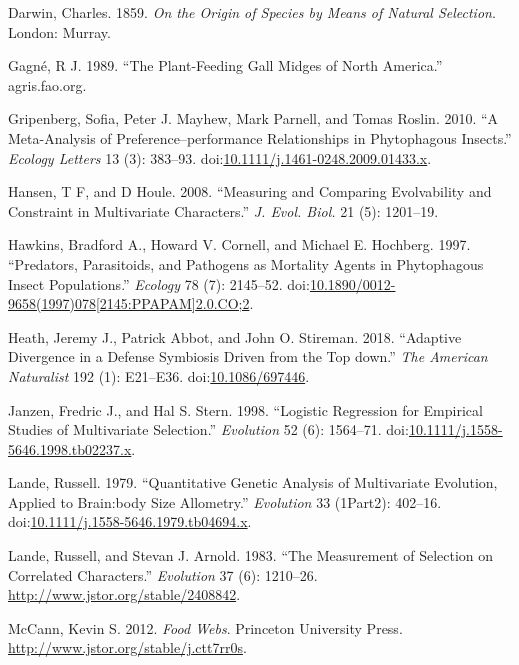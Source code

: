 \documentclass[11pt,]{article}
\begin{document}
\hypertarget{ref-Darwin1859}{}
Darwin, Charles. 1859. \emph{On the Origin of Species by Means of
Natural Selection}. London: Murray.

\hypertarget{ref-Gagne1989}{}
Gagné, R J. 1989. ``The Plant-Feeding Gall Midges of North America.''
agris.fao.org.

\hypertarget{ref-Gripenberg2010}{}
Gripenberg, Sofia, Peter J. Mayhew, Mark Parnell, and Tomas Roslin.
2010. ``A Meta-Analysis of Preference--performance Relationships in
Phytophagous Insects.'' \emph{Ecology Letters} 13 (3): 383--93.
doi:\href{https://doi.org/10.1111/j.1461-0248.2009.01433.x}{10.1111/j.1461-0248.2009.01433.x}.

\hypertarget{ref-Hansen2008}{}
Hansen, T F, and D Houle. 2008. ``Measuring and Comparing Evolvability
and Constraint in Multivariate Characters.'' \emph{J. Evol. Biol.} 21
(5): 1201--19.

\hypertarget{ref-Hawkins1997}{}
Hawkins, Bradford A., Howard V. Cornell, and Michael E. Hochberg. 1997.
``Predators, Parasitoids, and Pathogens as Mortality Agents in
Phytophagous Insect Populations.'' \emph{Ecology} 78 (7): 2145--52.
doi:\href{https://doi.org/10.1890/0012-9658(1997)078\%5B2145:PPAPAM\%5D2.0.CO;2}{10.1890/0012-9658(1997)078{[}2145:PPAPAM{]}2.0.CO;2}.

\hypertarget{ref-Heath2018}{}
Heath, Jeremy J., Patrick Abbot, and John O. Stireman. 2018. ``Adaptive
Divergence in a Defense Symbiosis Driven from the Top down.'' \emph{The
American Naturalist} 192 (1): E21--E36.
doi:\href{https://doi.org/10.1086/697446}{10.1086/697446}.

\hypertarget{ref-Janzen1998}{}
Janzen, Fredric J., and Hal S. Stern. 1998. ``Logistic Regression for
Empirical Studies of Multivariate Selection.'' \emph{Evolution} 52 (6):
1564--71.
doi:\href{https://doi.org/10.1111/j.1558-5646.1998.tb02237.x}{10.1111/j.1558-5646.1998.tb02237.x}.

\hypertarget{ref-Lande1979}{}
Lande, Russell. 1979. ``Quantitative Genetic Analysis of Multivariate
Evolution, Applied to Brain:body Size Allometry.'' \emph{Evolution} 33
(1Part2): 402--16.
doi:\href{https://doi.org/10.1111/j.1558-5646.1979.tb04694.x}{10.1111/j.1558-5646.1979.tb04694.x}.

\hypertarget{ref-Lande1983}{}
Lande, Russell, and Stevan J. Arnold. 1983. ``The Measurement of
Selection on Correlated Characters.'' \emph{Evolution} 37 (6): 1210--26.
\url{http://www.jstor.org/stable/2408842}.

\hypertarget{ref-McCann2012}{}
McCann, Kevin S. 2012. \emph{Food Webs}. Princeton University Press.
\url{http://www.jstor.org/stable/j.ctt7rr0s}.
\end{document}
